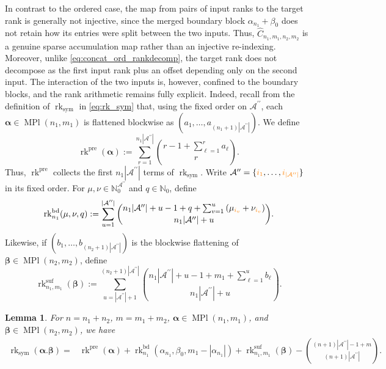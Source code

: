 \documentclass{amsart}
\newtheorem{lemma}[theorem]{Lemma}
\theoremstyle{definition}
\theoremstyle{remark}
\newcommand{\dott}{.}
\newcommand{\orange}[1]{{\color{orange}#1}}
\begin{document}
In contrast to the ordered case, the map from pairs of input ranks to
the target rank is generally not injective, since the merged boundary
block $\alpha_{n_1}+\beta_0$ does not retain how its entries were split
between the two inputs. Thus,
$\widehat{C}_{n_1,m_1,n_2,m_2}$ is a genuine sparse accumulation map
rather than an injective re-indexing. Moreover, unlike
\eqref{eq:concat_ord_rankdecomp}, the target rank does not decompose as
the first input rank plus an offset depending only on the second input.
The interaction of the two inputs is, however, confined to the boundary
blocks, and the rank arithmetic remains fully explicit.
Indeed, recall
from the definition of $\operatorname{rk}_{\mathrm{sym}}$ in
\eqref{eq:rk_sym} that, using the fixed order on
$\mathcal{A}^{\prime\prime}$, each
$\boldsymbol{\alpha}\in\operatorname{MPl}(n_1,m_1)$ is flattened
blockwise as
$(a_1,\ldots,a_{(n_1+1)|\mathcal{A}^{\prime\prime}|})$. We define
\[
    \operatorname{rk}^{\mathrm{pre}}(\boldsymbol{\alpha})
    :=
    \sum_{r=1}^{n_1|\mathcal{A}^{\prime\prime}|}
    \binom{
        r-1+\sum_{\ell=1}^{r}a_\ell
    }{r}.
\]
Thus, $\operatorname{rk}^{\mathrm{pre}}$ collects the first
$n_1|\mathcal{A}^{\prime\prime}|$ terms of
$\operatorname{rk}_{\mathrm{sym}}$.
Write
$\mathcal{A}^{\prime\prime}
=
\{\orange{i_1},\ldots,
\orange{i_{|\mathcal{A}^{\prime\prime}|}}\}$
in its fixed order. For
$\mu,\nu\in\mathbb{N}_0^{\mathcal{A}^{\prime\prime}}$ and
$q\in\mathbb{N}_0$, define
\[
    \operatorname{rk}^{\mathrm{bd}}_{n_1}(\mu,\nu,q)
    :=
    \sum_{u=1}^{|\mathcal{A}^{\prime\prime}|}
    \binom{
        n_1|\mathcal{A}^{\prime\prime}|
        +u-1+q
        +\sum_{v=1}^{u}
        \left(
            \mu_{\orange{i_v}}
            +
            \nu_{\orange{i_v}}
        \right)
    }{
        n_1|\mathcal{A}^{\prime\prime}|+u
    }.
\]
Likewise, if
$(b_1,\ldots,b_{(n_2+1)|\mathcal{A}^{\prime\prime}|})$
is the blockwise flattening of
$\boldsymbol{\beta}\in\operatorname{MPl}(n_2,m_2)$, define
\[
    \operatorname{rk}^{\mathrm{suf}}_{n_1,m_1}
    (\boldsymbol{\beta})
    :=
    \sum_{u=|\mathcal{A}^{\prime\prime}|+1}^{
        (n_2+1)|\mathcal{A}^{\prime\prime}|
    }
    \binom{
        n_1|\mathcal{A}^{\prime\prime}|
        +u-1+m_1+\sum_{\ell=1}^{u}b_\ell
    }{
        n_1|\mathcal{A}^{\prime\prime}|+u
    }.
\]

\begin{lemma}
\label{lem:rk_sym_concat}
For $n=n_1+n_2$, $m=m_1+m_2$,
$\boldsymbol{\alpha}\in\operatorname{MPl}(n_1,m_1)$, and
$\boldsymbol{\beta}\in\operatorname{MPl}(n_2,m_2)$, we have
\[
\begin{aligned}
    \operatorname{rk}_{\mathrm{sym}}
    \left(
        \boldsymbol{\alpha}\dott\boldsymbol{\beta}
    \right)
    ={}&
    \operatorname{rk}^{\mathrm{pre}}(\boldsymbol{\alpha})
    +
    \operatorname{rk}^{\mathrm{bd}}_{n_1}
    \left(
        \alpha_{n_1},
        \beta_0,
        m_1-|\alpha_{n_1}|
    \right)
    +
    \operatorname{rk}^{\mathrm{suf}}_{n_1,m_1}
    (\boldsymbol{\beta})
    -
    \binom{
        (n+1)|\mathcal{A}^{\prime\prime}|-1+m
    }{
        (n+1)|\mathcal{A}^{\prime\prime}|
    }.
\end{aligned}
\]
\end{lemma}
\end{document}
